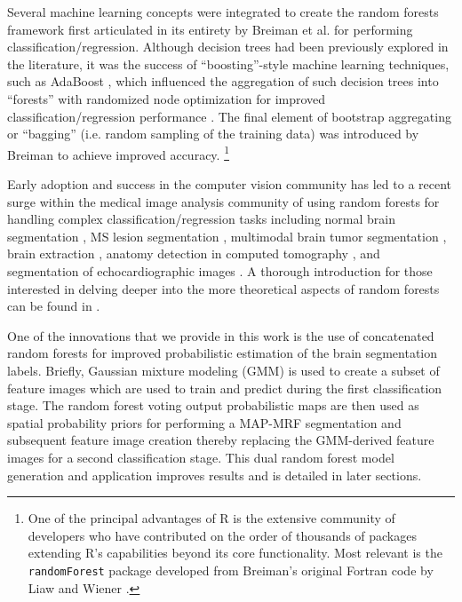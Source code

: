 \documentclass[final,5p,times,twocolumn]{elsarticle}
\begin{document}
Several machine learning concepts were integrated to create 
the random forests framework first articulated in its entirety by Breiman
et al. \cite{breiman2001} for performing classification/regression.  
Although decision trees had been previously explored in the literature, 
it was the success of ``boosting''-style machine learning 
techniques, such as AdaBoost \cite{schapire1990,freund1997}, which influenced 
the aggregation of such decision trees into ``forests'' 
with randomized node optimization for improved
classification/regression performance \cite{ho1995,amit1997}.
The final element of bootstrap aggregating or ``bagging'' (i.e.
random sampling of the training data) was
introduced by Breiman \cite{breiman1996} to achieve improved
accuracy.%
\footnote{
One of the principal advantages of R is the extensive community of
developers  who have contributed on the order of thousands of packages 
extending R's capabilities beyond its core functionality.
Most relevant 
is the {\tt randomForest} package developed from Breiman's original
Fortran code by Liaw and Wiener \citep{liaw2002}.
}

Early adoption \cite{viola2005} and success in the
computer vision community
has led to a recent surge within the medical image analysis
community of using random forests for handling complex 
classification/regression tasks including
normal brain segmentation \cite{yi2009},
MS lesion segmentation \cite{geremia2011}, 
multimodal brain tumor segmentation
\cite{bauer2012,zikic2012}, brain extraction \cite{iglesias2010}, 
anatomy detection in computed tomography \cite{criminisi2013}, and
segmentation of echocardiographic images \cite{verhoek2011}. 
A thorough introduction for those interested in delving deeper 
into the more theoretical aspects of random forests can be found
in \cite{criminisi2011}.


One of the innovations that we provide in this work is
the use of concatenated random forests for improved probabilistic estimation
of the brain segmentation labels.  Briefly, Gaussian mixture
modeling (GMM) is used to create a subset of feature images which are
used to train and predict during the first classification stage.  
The random forest voting output probabilistic maps are then used as 
spatial probability priors for performing a MAP-MRF segmentation
and subsequent feature image creation
thereby replacing the GMM-derived feature images for a second
classification stage.  This dual random forest model generation
and application
improves results and is detailed in later sections.
\end{document}
